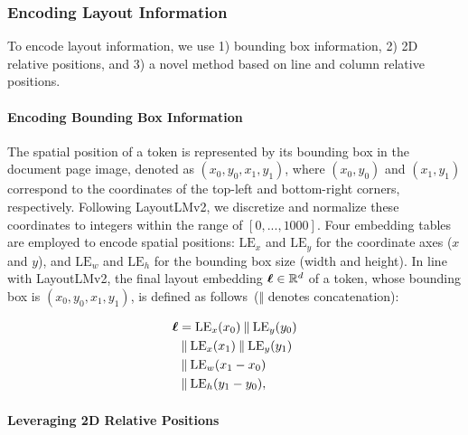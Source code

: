 
\subsubsection{Encoding Layout Information}

To encode layout information, we use 1) bounding box information, 2) 2D relative positions, and 3) a novel method based on line and column relative positions.

\paragraph{Encoding Bounding Box Information} 

The spatial position of a token is represented by its bounding box in the document page image, denoted as $(x_0, y_0, x_1, y_1)$, where $(x_0, y_0)$ and $(x_1, y_1)$ correspond to the coordinates of the top-left and bottom-right corners, respectively. Following LayoutLMv2, we discretize and normalize these coordinates to integers within the range of $[0, ..., 1000]$. Four embedding tables are employed to encode spatial positions: $\text{LE}_x$ and $\text{LE}_y$ for the coordinate axes ($x$ and $y$), and $\text{LE}_w$ and $\text{LE}_h$ for the bounding box size (width and height). In line with LayoutLMv2, the final layout embedding $\boldsymbol{\ell} \in \mathbb{R}^{d}$ of a token, whose bounding box is $(x_0, y_0, x_1, y_1)$, is defined as follows~($\mathbin\Vert$ denotes concatenation):

\begin{equation}
  \begin{split}
      \boldsymbol{\ell} & = \text{LE}_x(x_0) \mathbin\Vert \text{LE}_y(y_0) \\
      & \mathbin\Vert \text{LE}_x(x_1) \mathbin\Vert \text{LE}_y(y_1) \\
      & \mathbin\Vert \text{LE}_w(x_1 - x_0) \\
      & \mathbin\Vert \text{LE}_h(y_1 - y_0), 
  \end{split}
\label{eq:layout-embeddings}
\end{equation}

\paragraph{Leveraging 2D Relative Positions} 

